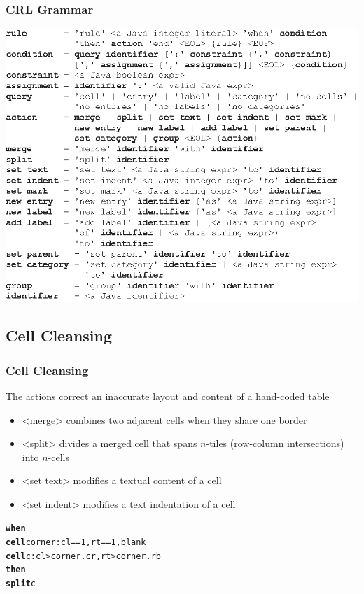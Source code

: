 \documentclass[10pt]{beamer}
\begin{document}
\begin{frame}
\frametitle{CRL Grammar}
\includegraphics[width=0.75\linewidth]{BNF}
\end{frame}

\subsection{Cell Cleansing}
\begin{frame}[fragile]
\frametitle{Cell Cleansing}
The actions correct an inaccurate layout and content of a hand-coded table
\begin{itemize}
	\item \alert{<merge>} combines two adjacent cells when they share one border
	\item \alert{<split>} divides a merged cell that spans $n$-tiles (row-column intersections) into $n$-cells
	\item \alert{<set text>} modifies a textual content of a cell
	\item \alert{<set indent>} modifies a text indentation of a cell
\end{itemize}
\footnotesize{
\begin{example}
\begin{alltt}
\textbf{when}
  \textbf{cell} corner: cl == 1, rt == 1, blank
  \textbf{cell} c: cl > corner.cr, rt > corner.rb
\textbf{then}
  \textbf{split} c
\end{alltt}
\end{example}
}
\end{frame}

\end{document}

